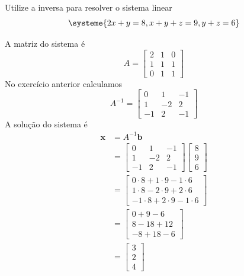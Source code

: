 \documentclass[a4paper,12pt,fleqn]{article}
\begin{document}
Utilize a inversa para resolver o sistema linear
\[
  \systeme{
    2x + y     = 8,
     x + y + z = 9,
         y + z = 6
  }
\]

\begin{answer}
A matriz do sistema é
\[
  A =
  \begin{bmatrix}
    2 & 1 & 0 \\
    1 & 1 & 1 \\
    0 & 1 & 1
  \end{bmatrix}
\]
No exercício anterior calculamos
\[
  A^{-1} =
  \begin{bmatrix}
    0  & 1  & -1 \\
    1  & -2 & 2  \\
    -1 & 2  & -1
  \end{bmatrix}
\]
A solução do sistema é
\begin{align*}
  \mathbf{x}
  & = A^{-1} \mathbf{b}
  \\[2mm]
  & =
    \begin{bmatrix}
      0  & 1  & -1 \\
      1  & -2 & 2  \\
      -1 & 2  & -1
    \end{bmatrix}
    \begin{bmatrix}
      8 \\
      9 \\
      6
    \end{bmatrix}
  \\[2mm]
  & =
    \begin{bmatrix}
       0 \cdot 8 + 1 \cdot 9 - 1 \cdot 6 \\
       1 \cdot 8 - 2 \cdot 9 + 2 \cdot 6 \\
      -1 \cdot 8 + 2 \cdot 9 - 1 \cdot 6
    \end{bmatrix}
  \\[2mm]
  & =
    \begin{bmatrix}
      0 +  9 - 6  \\
      8 - 18 + 12 \\
     -8 + 18 - 6
    \end{bmatrix}
  \\[2mm]
  & =
    \begin{bmatrix}
      3 \\
      2 \\
      4
    \end{bmatrix}
\end{align*}
\end{answer}

\end{document}
